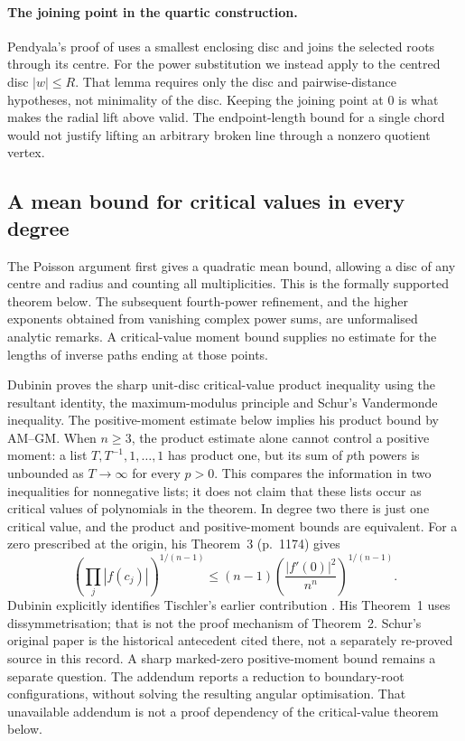 \documentclass[11pt]{article}
\begin{document}
\paragraph{The joining point in the quartic construction.}
Pendyala's proof of \cite[Theorem~1, pp.~2--3]{june2026} uses a
smallest enclosing disc and joins the selected roots through its centre.
For the power substitution we instead apply \cite[Lemma~1]{june2026}
to the centred disc $|w|\le R$. That lemma requires only the disc and
pairwise-distance hypotheses, not minimality of the disc. Keeping the
joining point at $0$ is what makes the radial lift above valid. The
endpoint-length bound for a single chord would not justify lifting an
arbitrary broken line through a nonzero quotient vertex.

\subsection*{A mean bound for critical values in every degree}

The Poisson argument first gives a quadratic mean bound, allowing a
disc of any centre and radius and counting all multiplicities. This is
the formally supported theorem below. The subsequent fourth-power
refinement, and the higher exponents obtained from vanishing complex
power sums, are unformalised analytic remarks. A critical-value moment
bound supplies no estimate for the lengths of inverse paths ending at
those points.

Dubinin \cite[Theorem~2, (9), pp.~1172--1173]{dubinin2006critical}
proves the sharp unit-disc critical-value product inequality using the
resultant identity, the maximum-modulus principle and Schur's Vandermonde
inequality. The positive-moment estimate below implies his product bound
by AM--GM. When $n\ge3$, the product estimate alone cannot control a
positive moment: a list $T,T^{-1},1,\ldots,1$ has product one, but its
sum of $p$th powers is unbounded as $T\to\infty$ for every $p>0$.
This compares the information in two inequalities for nonnegative lists;
it does not claim that these lists occur as critical values of polynomials
in the theorem. In degree two there is just one critical value, and the
product and positive-moment bounds are equivalent.
For a zero prescribed at the origin, his Theorem~3 (p.~1174) gives
\[
 \left(\prod_j|f(c_j)|\right)^{1/(n-1)}
 \le(n-1)\left(\frac{|f'(0)|^2}{n^n}\right)^{1/(n-1)}.
\]
Dubinin explicitly identifies Tischler's earlier contribution
\cite[p.~444, as reported in Dubinin]{tischler1989}.
His Theorem~1 uses dissymmetrisation; that is not the proof mechanism of
Theorem~2.  Schur's original paper \cite{schur1918} is the historical
antecedent cited there, not a separately re-proved source in this record.
A sharp marked-zero positive-moment bound remains a separate question.
The addendum \cite[Section~3]{revision2026} reports a reduction to
boundary-root configurations, without solving the resulting angular
optimisation. That unavailable addendum is not a proof dependency of the
critical-value theorem below.
\end{document}
